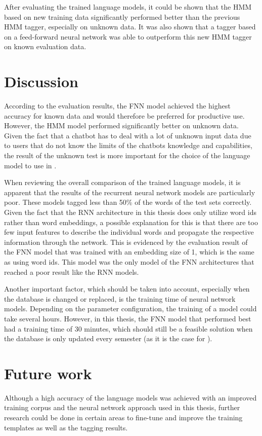 After evaluating the trained language models, it could be shown that the HMM based on new training data significantly performed better than the previous HMM tagger, especially on unknown data. It was also shown that a tagger based on a feed-forward neural network was able to outperform this new HMM tagger on known evaluation data.

\section{Discussion}\label{c.conclusion.discussion}
According to the evaluation results, the FNN model achieved the highest accuracy for known data and would therefore be preferred for productive use. However, the HMM model performed significantly better on unknown data. Given the fact that a chatbot has to deal with a lot of unknown input data due to users that do not know the limits of the chatbots knowledge and capabilities, the result of the unknown test is more important for the choice of the language model to use in \Alex.

When reviewing the overall comparison of the trained language models, it is apparent that the results of the recurrent neural network models are particularly poor. These models tagged less than 50\% of the words of the test sets correctly. Given the fact that the RNN architecture in this thesis does only utilize word ids rather than word embeddings, a possible explanation for this is that there are too few input features to describe the individual words and propagate the respective information through the network. This is evidenced by the evaluation result of the FNN model that was trained with an embedding size of 1, which is the same as using word ids. This model was the only model of the FNN architectures that reached a poor result like the RNN models.

Another important factor, which should be taken into account, especially when the database is changed or replaced, is the training time of neural network models. Depending on the parameter configuration, the training of a model could take several hours. However, in this thesis, the FNN model that performed best had a training time of 30 minutes, which should still be a feasible solution when the database is only updated every semester (as it is the case for \Alex).

\section{Future work}\label{c.conclusion.future}
Although a high accuracy of the language models was achieved with an improved training corpus and the neural network approach used in this thesis, further research could be done in certain areas to fine-tune and improve the training templates as well as the tagging results.

